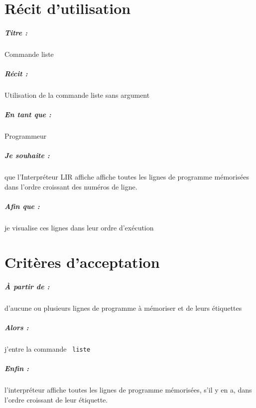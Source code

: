 \documentclass[12pt,a5paper, notitle, oneside]{report}
\begin{document}
    \chapter*{Récit d'utilisation}

    \paragraph{Titre : } Commande liste
    \paragraph{Récit : } Utilisation de la commande liste sans argument
    \paragraph{En tant que : } Programmeur
    \paragraph{Je souhaite : } que l'Interpréteur LIR affiche affiche
    toutes les lignes de programme mémorisées dans l'ordre
    croissant des numéros de ligne.
    \paragraph{Afin que : } je visualise ces lignes dans leur ordre
    d'exécution
    \newpage

    \chapter*{Critères d'acceptation}

    \paragraph{À partir de : } d'aucune ou plusieurs lignes de programme
    à mémoriser et de leurs étiquettes

    \paragraph{Alors : } j'entre la commande \verb| liste |

    \paragraph{Enfin : } l'interpréteur affiche toutes les lignes
    de programme mémorisées, s'il y en a, dans l'ordre croissant de leur
    étiquette.
\end{document}
